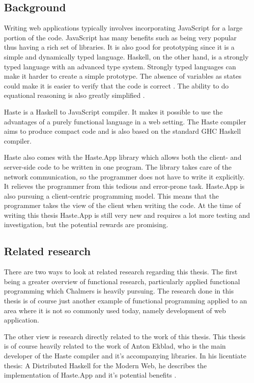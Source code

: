 \documentclass[a4paper]{article}
\begin{document}
\subsection{Background}
Writing web applications typically involves incorporating JavaScript for a large portion of the code. JavaScript has many benefits such as being very popular thus having a rich set of libraries. It is also good for prototyping since it is a simple and dynamically typed language. Haskell, on the other hand, is a strongly typed language with an advanced type system. Strongly typed languages can make it harder to create a simple prototype. The absence of variables as states could make it is easier to verify that the code is correct \cite{marlow2010haskell}. The ability to do equational reasoning is also greatly simplified \autocite{equational-reasoning}.

Haste is a Haskell to JavaScript compiler. It makes it possible to use the advantages of a purely functional language in a web setting. The Haste compiler aims to produce compact code and is also based on the standard GHC Haskell compiler.

Haste also comes with the Haste.App library which allows both the client- and server-side code to be written in one program\cite{ekblad2015seamless}. The library takes care of the network communication, so the programmer does not have to write it explicitly. It relieves the programmer from this tedious and error-prone task. Haste.App is also pursuing a client-centric programming model. This means that the programmer takes the view of the client when writing the code\cite{a-distributed-haskell-for-the-modern-web}. At the time of writing this thesis Haste.App is still very new and requires a lot more testing and investigation, but the potential rewards are promising.



\subsection{Related research}
There are two ways to look at related research regarding this thesis. The first being a greater overview of functional research, particularly applied functional programming which Chalmers is heavily pursuing. The research done in this thesis is of course just another example of functional programming applied to an area where it is not so commonly used today, namely development of web application.

The other view is research directly related to the work of this thesis. This thesis is of course heavily related to the work of Anton Ekblad, who is the main developer of the Haste compiler and it's accompanying libraries. In his licentiate thesis: A Distributed Haskell for the Modern Web, he describes the implementation of Haste.App and it's potential benefits \cite{a-distributed-haskell-for-the-modern-web}.
\end{document}
